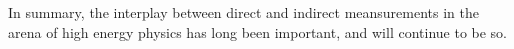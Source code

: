 %
%
%
%
%







In summary, the interplay between direct and indirect meansurements in the arena of high energy
physics has long been important, and will continue to be so.






